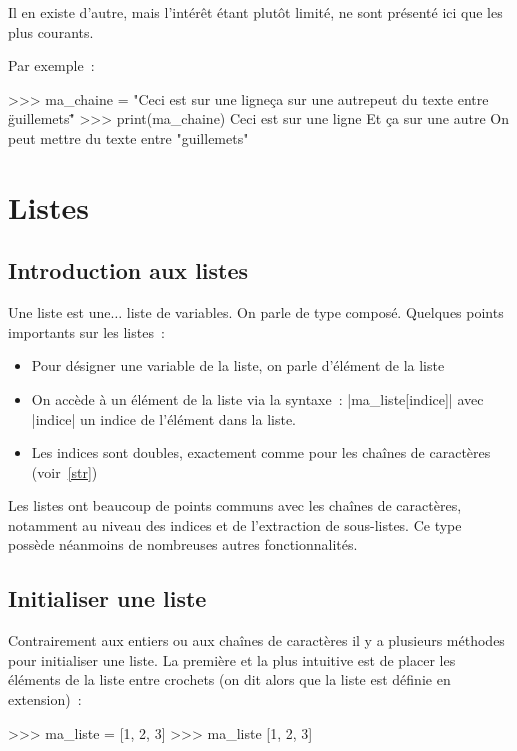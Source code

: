 		Il en existe d'autre, mais l'intérêt étant plutôt limité, ne sont présenté ici que les plus courants.
		
		Par exemple~:
		\begin{pythoncode}
			>>> ma_chaine = "Ceci est sur une ligne\nEt ça sur une autre\nOn peut du texte entre \"guillemets\""
			>>> print(ma_chaine)
			Ceci est sur une ligne
			Et ça sur une autre
			On peut mettre du texte entre "guillemets"
		\end{pythoncode}
		
\section{Listes} \label{list}

	\subsection{Introduction aux listes}
		
		Une liste est une$\ldots$ liste de variables. On parle de type composé.
		Quelques points importants sur les listes~:
		\begin{itemize}	
			\item Pour désigner une variable de la liste, on parle d'élément de la liste
			\item On accède à un élément de la liste via la syntaxe~: \python|ma_liste[indice]| avec \python|indice| un indice de l'élément dans la liste.
			\item Les indices sont doubles, exactement comme pour les chaînes de caractères (voir~\ref{str})
		\end{itemize}
		
		Les listes ont beaucoup de points communs avec les chaînes de caractères, notamment au niveau des indices et de l'extraction de sous-listes.
		Ce type possède néanmoins de nombreuses autres fonctionnalités.
	
	\subsection{Initialiser une liste}
		
		Contrairement aux entiers ou aux chaînes de caractères il y a plusieurs méthodes pour initialiser une liste. La première et la plus intuitive est de placer les éléments de la liste entre crochets (on dit alors que la liste est définie en extension)~:
		\begin{pythoncode}
			>>> ma_liste = [1, 2, 3]
			>>> ma_liste
			[1, 2, 3]
		\end{pythoncode}
		
